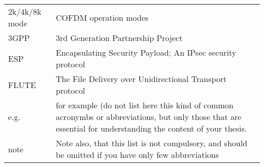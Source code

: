 \documentclass[12pt,a4paper,oneside,pdftex]{report}
\begin{document}

\noindent
\begin{longtable}{@{}p{}p{}@{}}
2k/4k/8k mode & COFDM operation modes \\
3GPP & 3rd Generation Partnership Project \\
ESP & Encapsulating Security Payload; An IPsec security protocol \\
FLUTE & The File Delivery over Unidirectional Transport protocol \\
e.g.& for example (do not list here this kind of common acronymbs or abbreviations, but only those that are essential for understanding the content of your thesis. \\
note & Note also, that this list is not compulsory, and should be omitted if you have only few abbreviations

\end{longtable}


\cleardoublepage
\tableofcontents



\label{pages-prelude}
\cleardoublepage

\startfirstchapter

\pagestyle{headings}
\end{document}
